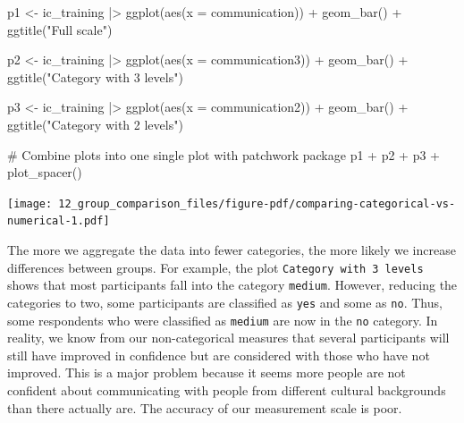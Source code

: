 \documentclass[
  letterpaper,
]{krantz}
\makeatletter
\newenvironment{Shaded}{\begin{snugshade}}{\end{snugshade}}
\newcommand{\AttributeTok}[1]{\textcolor[rgb]{0.40,0.45,0.13}{#1}}
\newcommand{\CommentTok}[1]{\textcolor[rgb]{0.37,0.37,0.37}{#1}}
\newcommand{\FunctionTok}[1]{\textcolor[rgb]{0.28,0.35,0.67}{#1}}
\newcommand{\NormalTok}[1]{\textcolor[rgb]{0.00,0.23,0.31}{#1}}
\newcommand{\OtherTok}[1]{\textcolor[rgb]{0.00,0.23,0.31}{#1}}
\newcommand{\SpecialCharTok}[1]{\textcolor[rgb]{0.37,0.37,0.37}{#1}}
\newcommand{\StringTok}[1]{\textcolor[rgb]{0.13,0.47,0.30}{#1}}
\newenvironment{kframe}{%
\medskip{}
\setlength{\fboxsep}{.8em}
 \def\at@end@of@kframe{}%
 \ifinner\ifhmode%
  \def\at@end@of@kframe{\end{minipage}}%
  \begin{minipage}{\columnwidth}%
 \fi\fi%
 \def\FrameCommand##1{\hskip\@totalleftmargin \hskip-\fboxsep
 \colorbox{shadecolor}{##1}\hskip-\fboxsep
     \hskip-\linewidth \hskip-\@totalleftmargin \hskip\columnwidth}%
 \MakeFramed {\advance\hsize-\width
   \@totalleftmargin\z@ \linewidth\hsize
   \@setminipage}}%
 {\par\unskip\endMakeFramed%
 \at@end@of@kframe}
\renewenvironment{Shaded}{\begin{kframe}}{\end{kframe}}
\makeatother
\begin{document}
\begin{Shaded}
\begin{Highlighting}[]
\NormalTok{p1 }\OtherTok{\textless{}{-}}
\NormalTok{  ic\_training }\SpecialCharTok{|\textgreater{}}
  \FunctionTok{ggplot}\NormalTok{(}\FunctionTok{aes}\NormalTok{(}\AttributeTok{x =}\NormalTok{ communication)) }\SpecialCharTok{+}
  \FunctionTok{geom\_bar}\NormalTok{() }\SpecialCharTok{+}
  \FunctionTok{ggtitle}\NormalTok{(}\StringTok{"Full scale"}\NormalTok{)}

\NormalTok{p2 }\OtherTok{\textless{}{-}}
\NormalTok{  ic\_training }\SpecialCharTok{|\textgreater{}}
  \FunctionTok{ggplot}\NormalTok{(}\FunctionTok{aes}\NormalTok{(}\AttributeTok{x =}\NormalTok{ communication3)) }\SpecialCharTok{+}
  \FunctionTok{geom\_bar}\NormalTok{() }\SpecialCharTok{+}
  \FunctionTok{ggtitle}\NormalTok{(}\StringTok{"Category with 3 levels"}\NormalTok{)}

\NormalTok{p3 }\OtherTok{\textless{}{-}}
\NormalTok{  ic\_training }\SpecialCharTok{|\textgreater{}}
  \FunctionTok{ggplot}\NormalTok{(}\FunctionTok{aes}\NormalTok{(}\AttributeTok{x =}\NormalTok{ communication2)) }\SpecialCharTok{+}
  \FunctionTok{geom\_bar}\NormalTok{() }\SpecialCharTok{+}
  \FunctionTok{ggtitle}\NormalTok{(}\StringTok{"Category with 2 levels"}\NormalTok{)}

\CommentTok{\# Combine plots into one single plot with \textquotesingle{}patchwork\textquotesingle{} package}
\NormalTok{p1 }\SpecialCharTok{+}\NormalTok{ p2 }\SpecialCharTok{+}\NormalTok{ p3 }\SpecialCharTok{+} \FunctionTok{plot\_spacer}\NormalTok{()}
\end{Highlighting}
\end{Shaded}

\texttt{[image: 12\_group\_comparison\_files/figure-pdf/comparing-categorical-vs-numerical-1.pdf]}

The more we aggregate the data into fewer categories, the more likely we
increase differences between groups. For example, the plot
\texttt{Category\ with\ 3\ levels} shows that most participants fall
into the category \texttt{medium}. However, reducing the categories to
two, some participants are classified as \texttt{yes} and some as
\texttt{no}. Thus, some respondents who were classified as
\texttt{medium} are now in the \texttt{no} category. In reality, we know
from our non-categorical measures that several participants will still
have improved in confidence but are considered with those who have not
improved. This is a major problem because it seems more people are not
confident about communicating with people from different cultural
backgrounds than there actually are. The accuracy of our measurement
scale is poor.
\end{document}
